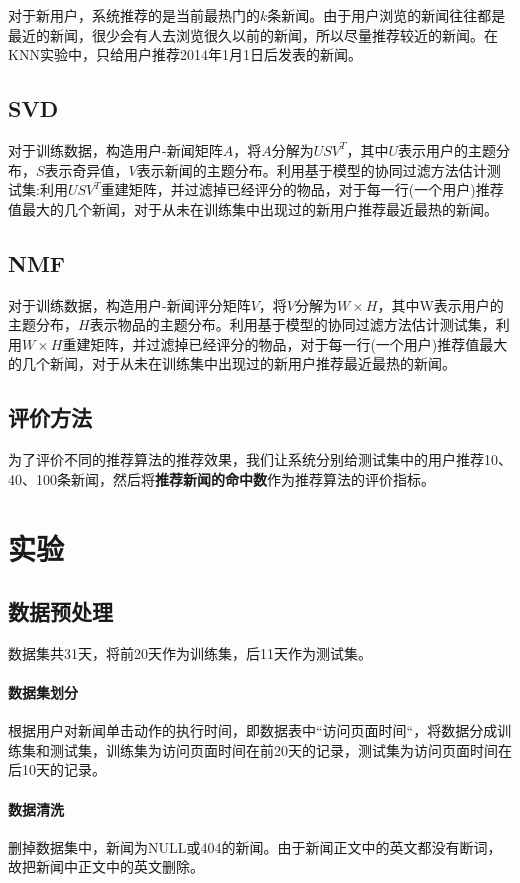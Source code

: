 \documentclass[UTF8]{article}
\begin{document}
对于新用户，系统推荐的是当前最热门的$k$条新闻。由于用户浏览的新闻往往都是最近的新闻，很少会有人去浏览很久以前的新闻，所以尽量推荐较近的新闻。在KNN实验中，只给用户推荐2014年1月1日后发表的新闻。

\subsection{SVD}
对于训练数据，构造用户-新闻矩阵$A$，将$A$分解为$USV^{T}$，其中$U$表示用户的主题分布，$S$表示奇异值，$V$表示新闻的主题分布。利用基于模型的协同过滤方法估计测试集:利用$USV^{T}$重建矩阵，并过滤掉已经评分的物品，对于每一行(一个用户)推荐值最大的几个新闻，对于从未在训练集中出现过的新用户推荐最近最热的新闻。
\subsection{NMF}
对于训练数据，构造用户-新闻评分矩阵$V$，将$V$分解为$W\times H$，其中W表示用户的主题分布，$H$表示物品的主题分布。利用基于模型的协同过滤方法估计测试集，利用$W\times H$重建矩阵，并过滤掉已经评分的物品，对于每一行(一个用户)推荐值最大的几个新闻，对于从未在训练集中出现过的新用户推荐最近最热的新闻。
\subsection{评价方法}
为了评价不同的推荐算法的推荐效果，我们让系统分别给测试集中的用户推荐10、40、100条新闻，然后将\textbf{推荐新闻的命中数}作为推荐算法的评价指标。

\section{实验}
\subsection{数据预处理}
数据集共31天，将前20天作为训练集，后11天作为测试集。

\paragraph{数据集划分} 根据用户对新闻单击动作的执行时间，即数据表中“访问页面时间“，将数据分成训练集和测试集，训练集为访问页面时间在前20天的记录，测试集为访问页面时间在后10天的记录。
\paragraph{数据清洗} 删掉数据集中，新闻为NULL或404的新闻。由于新闻正文中的英文都没有断词，故把新闻中正文中的英文删除。
\end{document}
